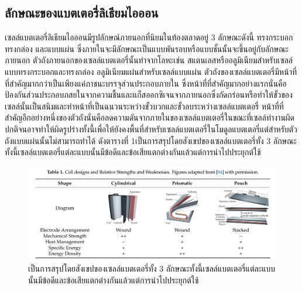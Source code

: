 \subsection{ลักษณะของแบตเตอรี่ลิเธียมไอออน}
เซลล์แบตเตอรี่ลิเธียมไอออนมีรูปลักษณ์ภายนอกที่นิยมในท้องตลาดอยู่ 3 ลักษณะดังนี้ ทรงกระบอก ทรงกล่อง และแบบแผ่น ซึ่งภายในจะมีลักษณะเป็นแบบพันรอบหรือแบบชั้นนั้นจะขึ้นอยู่กับลักษณะภายนอก\newline
ตัวถังภายนอกของเซลล์แบตเตอรี่นั้นทำจากโลหะเช่น สแตนเลสหรืออลูมิเนียมสำหรับเซลล์แบบทรงกระบอกและทรงกล่อง อลูมิเนียมแผ่นสำหรับเซลล์แบบแผ่น ตัวถังของเซลล์แบตเตอรี่มีหน้าที่ที่สำคัญมากกว่าเป็นเพียงแค่ภาชนะบรรจุส่วนประกอบภายใน ซึ่งหน้าที่ที่สำคัญมากอย่างแรกนั่นคือป้องกันส่วนประกอบภสยในจากความชื้นและแก็สออกซิเจนจากภายนอกซึ่งกัดกร่อนหรือทำให้ขั้วของเซลล์นั้นเป็นสนิมและทำหน้าที่เป็นฉนวนระหว่างขั้วบวกและขั้วลบระหว่างเซลล์แบตเตอรี่ หน้าที่ที่สำคัญอีกอย่างหนึ่งของตัวถังนั่นคือลดความดันจากภายในของเซลล์แบตเตอรี่ในขณะที่เซลล์ทำงานผิดปกติจนอาจทำให้ผิดรูปร่างทั้งนี้เพื่อให้ยังคงพื้นที่สำหรับเซลล์แบตเตอรี่ในโมดูลแบตเตอรี่แต่สำหรับตัวถังแบบแผ่นนั้นไม่สามารถทำได้\newline
ดังตารางที่ 1เป็นการสรุปโดยสังเขปของเซลล์แบตเตอรี่ทั้ง 3 ลักษณะทั้งนี้เซลล์แบตเตอรี่แต่ละแบบนั้นมีข้อดีและข้อเสียแตกต่างกันแล้วแต่การนำไปประยุกต์ใช้
\begin{center}
	\begin{figure}[!h]
		\includegraphics[width=0.6\linewidth]{Chapters/img/Compare_Cell.png}
			\centering
			\captionsetup{justification=centering,margin=2cm}
			\caption{เป็นการสรุปโดยสังเขปของเซลล์แบตเตอรี่ทั้ง 3 ลักษณะทั้งนี้เซลล์แบตเตอรี่แต่ละแบบนั้นมีข้อดีและข้อเสียแตกต่างกันแล้วแต่การนำไปประยุกต์ใช้}
	\end{figure}
\end{center}

